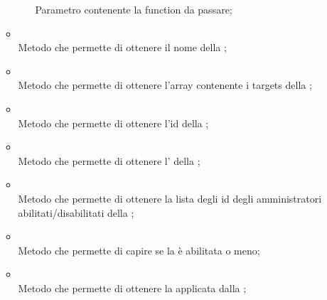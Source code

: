 \begin{itemize}
\begin{itemize}
\begin{itemize}
			Parametro contenente la function da passare;
		\end{itemize}
		\item[]  \\
		Metodo che permette di ottenere il nome della ;\\
		\item[]  \\
		Metodo che permette di ottenere l'array contenente i targets della ;\\
		\item[]  \\
		Metodo che permette di ottenere l'id della ;\\
		\item[]  \\
		Metodo che permette di ottenere l' della ;\\
		\item[]  \\
		Metodo che permette di ottenere la lista degli id degli amministratori abilitati/disabilitati della ;\\
		\item[]  \\
		Metodo che permette di capire se la  è abilitata o meno;\\
		\item[]  \\
		Metodo che permette di ottenere la  applicata dalla ;\\
	\end{itemize}
\end{itemize}
\FloatBarrier

